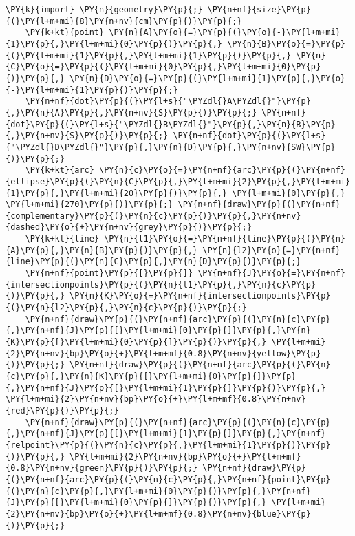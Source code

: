 \begin{Verbatim}[commandchars=\\\{\}]
    \PY{k}{import} \PY{n}{geometry}\PY{p}{;} \PY{n+nf}{size}\PY{p}{(}\PY{l+m+mi}{8}\PY{n+nv}{cm}\PY{p}{)}\PY{p}{;}
    \PY{k+kt}{point} \PY{n}{A}\PY{o}{=}\PY{p}{(}\PY{o}{-}\PY{l+m+mi}{1}\PY{p}{,}\PY{l+m+mi}{0}\PY{p}{)}\PY{p}{,} \PY{n}{B}\PY{o}{=}\PY{p}{(}\PY{l+m+mi}{1}\PY{p}{,}\PY{l+m+mi}{1}\PY{p}{)}\PY{p}{,} \PY{n}{C}\PY{o}{=}\PY{p}{(}\PY{l+m+mi}{0}\PY{p}{,}\PY{l+m+mi}{0}\PY{p}{)}\PY{p}{,} \PY{n}{D}\PY{o}{=}\PY{p}{(}\PY{l+m+mi}{1}\PY{p}{,}\PY{o}{-}\PY{l+m+mi}{1}\PY{p}{)}\PY{p}{;}
    \PY{n+nf}{dot}\PY{p}{(}\PY{l+s}{"\PYZdl{}A\PYZdl{}"}\PY{p}{,}\PY{n}{A}\PY{p}{,}\PY{n+nv}{S}\PY{p}{)}\PY{p}{;} \PY{n+nf}{dot}\PY{p}{(}\PY{l+s}{"\PYZdl{}B\PYZdl{}"}\PY{p}{,}\PY{n}{B}\PY{p}{,}\PY{n+nv}{S}\PY{p}{)}\PY{p}{;} \PY{n+nf}{dot}\PY{p}{(}\PY{l+s}{"\PYZdl{}D\PYZdl{}"}\PY{p}{,}\PY{n}{D}\PY{p}{,}\PY{n+nv}{SW}\PY{p}{)}\PY{p}{;}
    \PY{k+kt}{arc} \PY{n}{c}\PY{o}{=}\PY{n+nf}{arc}\PY{p}{(}\PY{n+nf}{ellipse}\PY{p}{(}\PY{n}{C}\PY{p}{,}\PY{l+m+mi}{2}\PY{p}{,}\PY{l+m+mi}{1}\PY{p}{,}\PY{l+m+mi}{20}\PY{p}{)}\PY{p}{,} \PY{l+m+mi}{0}\PY{p}{,} \PY{l+m+mi}{270}\PY{p}{)}\PY{p}{;} \PY{n+nf}{draw}\PY{p}{(}\PY{n+nf}{complementary}\PY{p}{(}\PY{n}{c}\PY{p}{)}\PY{p}{,}\PY{n+nv}{dashed}\PY{o}{+}\PY{n+nv}{grey}\PY{p}{)}\PY{p}{;}
    \PY{k+kt}{line} \PY{n}{l1}\PY{o}{=}\PY{n+nf}{line}\PY{p}{(}\PY{n}{A}\PY{p}{,}\PY{n}{B}\PY{p}{)}\PY{p}{,} \PY{n}{l2}\PY{o}{=}\PY{n+nf}{line}\PY{p}{(}\PY{n}{C}\PY{p}{,}\PY{n}{D}\PY{p}{)}\PY{p}{;}
    \PY{n+nf}{point}\PY{p}{[}\PY{p}{]} \PY{n+nf}{J}\PY{o}{=}\PY{n+nf}{intersectionpoints}\PY{p}{(}\PY{n}{l1}\PY{p}{,}\PY{n}{c}\PY{p}{)}\PY{p}{,} \PY{n}{K}\PY{o}{=}\PY{n+nf}{intersectionpoints}\PY{p}{(}\PY{n}{l2}\PY{p}{,}\PY{n}{c}\PY{p}{)}\PY{p}{;}
    \PY{n+nf}{draw}\PY{p}{(}\PY{n+nf}{arc}\PY{p}{(}\PY{n}{c}\PY{p}{,}\PY{n+nf}{J}\PY{p}{[}\PY{l+m+mi}{0}\PY{p}{]}\PY{p}{,}\PY{n}{K}\PY{p}{[}\PY{l+m+mi}{0}\PY{p}{]}\PY{p}{)}\PY{p}{,} \PY{l+m+mi}{2}\PY{n+nv}{bp}\PY{o}{+}\PY{l+m+mf}{0.8}\PY{n+nv}{yellow}\PY{p}{)}\PY{p}{;} \PY{n+nf}{draw}\PY{p}{(}\PY{n+nf}{arc}\PY{p}{(}\PY{n}{c}\PY{p}{,}\PY{n}{K}\PY{p}{[}\PY{l+m+mi}{0}\PY{p}{]}\PY{p}{,}\PY{n+nf}{J}\PY{p}{[}\PY{l+m+mi}{1}\PY{p}{]}\PY{p}{)}\PY{p}{,} \PY{l+m+mi}{2}\PY{n+nv}{bp}\PY{o}{+}\PY{l+m+mf}{0.8}\PY{n+nv}{red}\PY{p}{)}\PY{p}{;}
    \PY{n+nf}{draw}\PY{p}{(}\PY{n+nf}{arc}\PY{p}{(}\PY{n}{c}\PY{p}{,}\PY{n+nf}{J}\PY{p}{[}\PY{l+m+mi}{1}\PY{p}{]}\PY{p}{,}\PY{n+nf}{relpoint}\PY{p}{(}\PY{n}{c}\PY{p}{,}\PY{l+m+mi}{1}\PY{p}{)}\PY{p}{)}\PY{p}{,} \PY{l+m+mi}{2}\PY{n+nv}{bp}\PY{o}{+}\PY{l+m+mf}{0.8}\PY{n+nv}{green}\PY{p}{)}\PY{p}{;} \PY{n+nf}{draw}\PY{p}{(}\PY{n+nf}{arc}\PY{p}{(}\PY{n}{c}\PY{p}{,}\PY{n+nf}{point}\PY{p}{(}\PY{n}{c}\PY{p}{,}\PY{l+m+mi}{0}\PY{p}{)}\PY{p}{,}\PY{n+nf}{J}\PY{p}{[}\PY{l+m+mi}{0}\PY{p}{]}\PY{p}{)}\PY{p}{,} \PY{l+m+mi}{2}\PY{n+nv}{bp}\PY{o}{+}\PY{l+m+mf}{0.8}\PY{n+nv}{blue}\PY{p}{)}\PY{p}{;}

\end{Verbatim}
